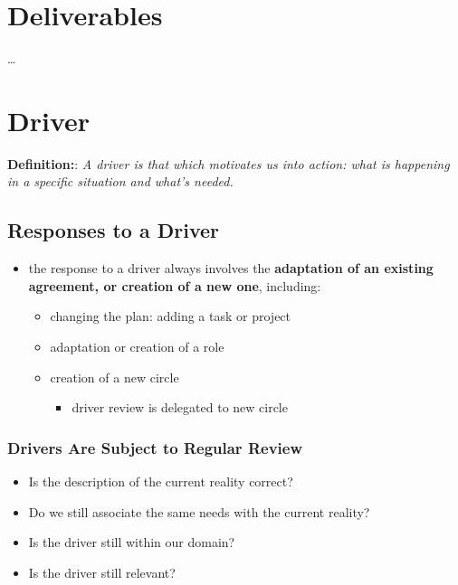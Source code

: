\section{Deliverables}
\label{deliverables}

{\ldots}

\section{Driver}
\label{driver}

\textbf{Definition:}: \emph{A driver is that which motivates us into action: what is happening in a specific situation and what’s needed.}

\subsection{Responses to a Driver}
\label{responsestoadriver}

\begin{itemize}
\item the response to a driver always involves the \textbf{adaptation of an existing agreement, or creation of a new one}, including:

\begin{itemize}
\item changing the plan: adding a task or project

\item adaptation or creation of a role

\item creation of a new circle

\begin{itemize}
\item driver review is delegated to new circle

\end{itemize}

\end{itemize}

\end{itemize}

\subsubsection{Drivers Are Subject to Regular Review}
\label{driversaresubjecttoregularreview}

\begin{itemize}
\item Is the description of the current reality correct?

\item Do we still associate the same needs with the current reality?

\item Is the driver still within our domain?

\item Is the driver still relevant?

\end{itemize}

